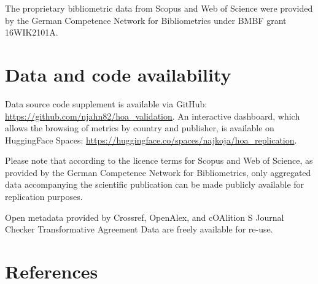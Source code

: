 \documentclass[a4paper,man,floatsintext,longtable,noextraspace,10pt]{apa6}
\begin{document}
The proprietary bibliometric data from Scopus and Web of Science were
provided by the German Competence Network for Bibliometrics under BMBF
grant 16WIK2101A.

\section*{Data and code availability}\label{data-and-code-availability}

Data source code supplement is available via GitHub:
\url{https://github.com/njahn82/hoa_validation}. An interactive
dashboard, which allows the browsing of metrics by country and
publisher, is available on HuggingFace Spaces:
\url{https://huggingface.co/spaces/najkoja/hoa_replication}.

Please note that according to the licence terms for Scopus and Web of
Science, as provided by the German Competence Network for Bibliometrics,
only aggregated data accompanying the scientific publication can be made
publicly available for replication purposes.

Open metadata provided by Crossref, OpenAlex, and cOAlition S Journal
Checker Transformative Agreement Data are freely available for re-use.

\section*{References}\label{references}
\end{document}
